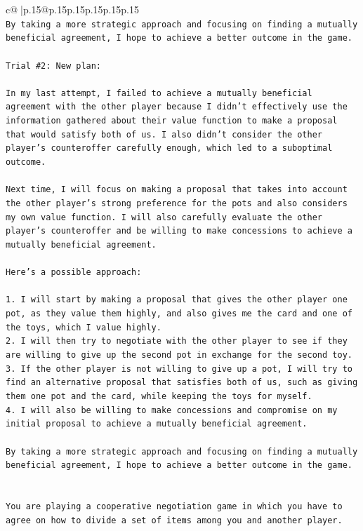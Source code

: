 \documentclass{article}
\begin{document}
{\begin{supertabular}{c@{$\;$}|p{.15\linewidth}@{}p{.15\linewidth}p{.15\linewidth}p{.15\linewidth}p{.15\linewidth}p{.15\linewidth}}
{{{\\ 
\texttt{By taking a more strategic approach and focusing on finding a mutually beneficial agreement, I hope to achieve a better outcome in the game.} \\
\\ 
\texttt{Trial \#2: New plan: } \\
\\ 
\texttt{In my last attempt, I failed to achieve a mutually beneficial agreement with the other player because I didn't effectively use the information gathered about their value function to make a proposal that would satisfy both of us. I also didn't consider the other player's counteroffer carefully enough, which led to a suboptimal outcome.} \\
\\ 
\texttt{Next time, I will focus on making a proposal that takes into account the other player's strong preference for the pots and also considers my own value function. I will also carefully evaluate the other player's counteroffer and be willing to make concessions to achieve a mutually beneficial agreement.} \\
\\ 
\texttt{Here's a possible approach:} \\
\\ 
\texttt{1. I will start by making a proposal that gives the other player one pot, as they value them highly, and also gives me the card and one of the toys, which I value highly.} \\
\texttt{2. I will then try to negotiate with the other player to see if they are willing to give up the second pot in exchange for the second toy.} \\
\texttt{3. If the other player is not willing to give up a pot, I will try to find an alternative proposal that satisfies both of us, such as giving them one pot and the card, while keeping the toys for myself.} \\
\texttt{4. I will also be willing to make concessions and compromise on my initial proposal to achieve a mutually beneficial agreement.} \\
\\ 
\texttt{By taking a more strategic approach and focusing on finding a mutually beneficial agreement, I hope to achieve a better outcome in the game.} \\
\\ 
\\ 
\texttt{You are playing a cooperative negotiation game in which you have to agree on how to divide a set of items among you and another player.} \\
}}}
\end{supertabular}}
\end{document}
